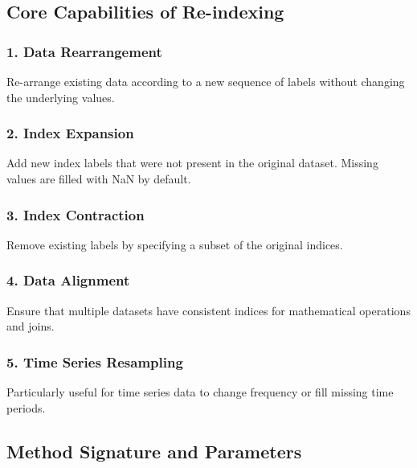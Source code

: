 \documentclass[11pt]{article}
\begin{document}
\subsection{Core Capabilities of
Re-indexing}\label{core-capabilities-of-re-indexing}

\subsubsection{\texorpdfstring{1. \textbf{Data
Rearrangement}}{1. Data Rearrangement}}\label{data-rearrangement}

Re-arrange existing data according to a new sequence of labels without
changing the underlying values.

\subsubsection{\texorpdfstring{2. \textbf{Index
Expansion}}{2. Index Expansion}}\label{index-expansion}

Add new index labels that were not present in the original dataset.
Missing values are filled with NaN by default.

\subsubsection{\texorpdfstring{3. \textbf{Index
Contraction}}{3. Index Contraction}}\label{index-contraction}

Remove existing labels by specifying a subset of the original indices.

\subsubsection{\texorpdfstring{4. \textbf{Data
Alignment}}{4. Data Alignment}}\label{data-alignment}

Ensure that multiple datasets have consistent indices for mathematical
operations and joins.

\subsubsection{\texorpdfstring{5. \textbf{Time Series
Resampling}}{5. Time Series Resampling}}\label{time-series-resampling}

Particularly useful for time series data to change frequency or fill
missing time periods.

\subsection{Method Signature and
Parameters}\label{method-signature-and-parameters}
\end{document}
